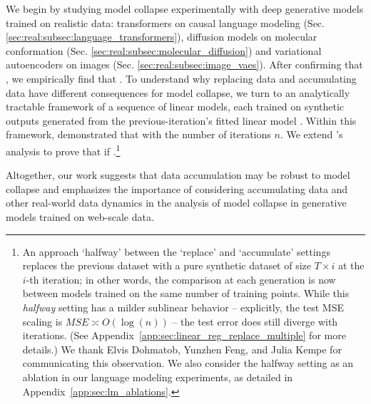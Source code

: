 We begin by studying model collapse experimentally with deep generative models trained on realistic data: transformers on causal language modeling (Sec. \ref{sec:real:subsec:language_transformers}), diffusion models on molecular conformation (Sec. \ref{sec:real:subsec:molecular_diffusion}) and variational autoencoders on images (Sec. \ref{sec:real:subsec:image_vaes}).
After confirming that , we empirically find that .
To understand why replacing data and accumulating data have different consequences for model collapse, we turn to an analytically tractable framework of a sequence of linear models, each trained on synthetic outputs generated from the previous-iteration's fitted linear model \citep{mobahi2020self, dohmatob2024model}. Within this framework, \citet{dohmatob2024model} demonstrated that  with the number of iterations $n$. We extend \citet{dohmatob2024model}'s analysis to prove that if .\footnote{An approach `halfway' between the `replace' and `accumulate' settings replaces the previous dataset with a pure synthetic dataset of size $T\times i$ at the $i$-th iteration; in other words,
the comparison at each generation is now between models trained on the same number of training points.
While this \emph{halfway} setting has a milder sublinear behavior -- explicitly, the test MSE scaling is $MSE \asymp O(\log(n))$ --  
the test error does still diverge with iterations. (See Appendix~\ref{app:sec:linear_reg_replace_multiple} for more details.)
We thank Elvis Dohmatob, Yunzhen Feng, and Julia Kempe for communicating this observation.  We also consider the halfway setting as an ablation in our language modeling experiments, as detailed in Appendix~\ref{app:sec:lm_ablations}.}


Altogether, our work suggests that data accumulation may be robust to model collapse and emphasizes the importance of considering accumulating data and other real-world data dynamics in the analysis of model collapse in generative models trained on web-scale data.

